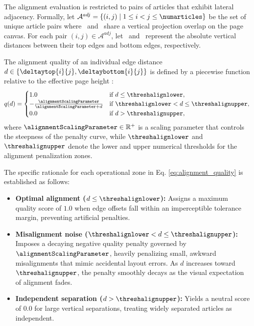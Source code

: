 The alignment evaluation is restricted to pairs of articles that exhibit lateral adjacency. Formally, let $\mathcal{A}^{adj} = \{(i,j) \mid 1 \le i < j \le \numarticles \}$ be the set of unique article pairs where \ and \ share a vertical projection overlap on the page canvas. For each pair $(i,j) \in \mathcal{A}^{adj}$, let \ and \ represent the absolute vertical distances between their top edges and bottom edges, respectively.

The alignment quality of an individual edge distance $d \in \{\deltaytop{i}{j}, \deltaybottom{i}{j}\}$ is  defined by a piecewise function relative to the effective page height \Heff:
\begin{equation}
q(d) = \begin{cases} 
1.0 & \text{if } d \le \threshalignlower, \\ 
-\frac{\alignmentScalingParameter}{\alignmentScalingParameter + d} & \text{if } \threshalignlower < d \le \threshalignupper, \\ 
0.0 & \text{if } d > \threshalignupper,
\end{cases}
\label{eq:alignment_quality}
\end{equation}
where $\alignmentScalingParameter \in \mathbb{R}^+$ is a scaling parameter that controls the steepness of the penalty curve, while $\threshalignlower$ and $\threshalignupper$ denote the lower and upper numerical thresholds for the alignment penalization zones.

The specific rationale for each operational zone in Eq. \ref{eq:alignment_quality} is established as follows:
\begin{itemize}
    \item \textbf{Optimal alignment ($d \le \threshalignlower$):} Assigns a maximum quality score of $1.0$ when edge offsets fall within an imperceptible tolerance margin, preventing artificial penalties.
    \item \textbf{Misalignment noise ($\threshalignlower < d \le \threshalignupper$):} Imposes a decaying negative quality penalty governed by $\alignmentScalingParameter$, heavily penalizing small, awkward misalignments that mimic accidental layout errors. As $d$ increases toward $\threshalignupper$, the penalty smoothly decays as the visual expectation of alignment fades.
    \item \textbf{Independent separation ($d > \threshalignupper$):} Yields a neutral score of $0.0$ for large vertical separations, treating widely separated articles as independent.
\end{itemize}

